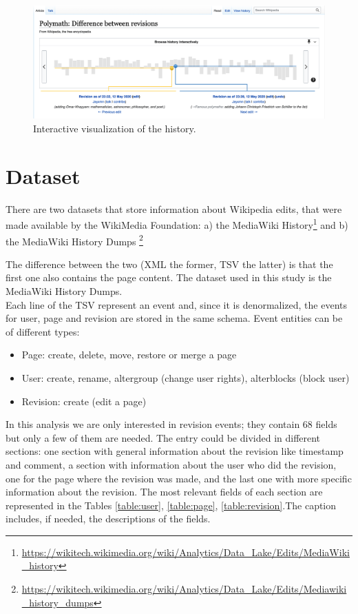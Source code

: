 \begin{figure}[H]
    \centering
    \includegraphics[width=1\textwidth]{./chapters/02/assets/history.png}
    \caption{Interactive visualization of the history.}
    \label{fig:history}
\end{figure}


\section{Dataset}
There are two datasets that store information about Wikipedia edits, that were made available by the WikiMedia
Foundation: a) the MediaWiki History\footnote{\url{https://wikitech.wikimedia.org/wiki/Analytics/Data_Lake/Edits/MediaWiki_history}} 
and b) the MediaWiki History Dumps \footnote{\url{https://wikitech.wikimedia.org/wiki/Analytics/Data_Lake/Edits/Mediawiki_history_dumps}}


The difference between the two (XML the former, TSV the latter) is that the first one also
contains the page content. The dataset used in this study is the MediaWiki History Dumps.\\

Each line of the TSV represent an event and, since it is denormalized, the events for user, page and
revision are stored in the same schema.
Event entities can be of different types:
\begin{itemize}
    \item Page: create, delete, move, restore or merge a page
    \item User: create, rename, altergroup (change user rights), alterblocks (block user)
    \item Revision: create (edit a page)
\end{itemize}

In this analysis we are only interested in revision events; they contain 68 fields but only a few of them are
needed. The entry could be divided in different sections: one section with general information about
the revision like timestamp and comment, a section with information about the user who did the
revision, one for the page where the revision was made, and the last one with more specific
information about the revision. The most relevant fields of each section are represented in the Tables 
\ref{table:user}, \ref{table:page}, \ref{table:revision}.The caption includes, if
needed, the descriptions of the fields.

